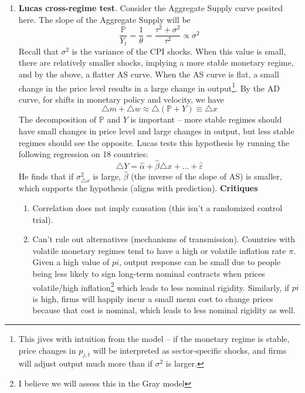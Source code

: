 \documentclass[12pt]{article}
\begin{document}
\begin{itemize}
\begin{enumerate}
        \item \textbf{Lucas cross-regime test}. Consider the Aggregate Supply curve posited here. The slope of the Aggregate Supply will be 
        \[\frac{\mathbb{P}}{Y_t} = \frac{1}{\theta} = \frac{\tau^2 + \sigma^2}{\tau^2} \propto \sigma^2\]
        Recall that $\sigma^2$ is the variance of the CPI shocks. When this value is small, there are relatively smaller shocks, implying a more stable monetary regime, and by the above, a flatter AS curve. When the AS curve is flat, a small change in the price level results in a large change in output\footnote{This jives with intuition from the model -- if the monetary regime is stable, price changes in $p_{j,t}$ will be interpreted as sector-specific shocks, and firms will adjust output much more than if $\sigma^2$ is larger.}. By the AD curve, for shifts in monetary policy and velocity, we have
        \[\triangle m + \triangle w \approx \triangle(\mathbb{P}+Y) \equiv \triangle x\]
        The decomposition of $\mathbb{P}$ and $Y$ is important -- more stable regimes should have small changes in price level and large changes in output, but less stable regimes should see the opposite. Lucas tests this hypothesis by running the following regression on 18 countries:
        \begin{equation}\label{Lucas Regression}
            \triangle Y = \hat{\alpha} + \hat{\beta} \triangle x + \hdots + \hat{\varepsilon}
        \end{equation}
        He finds that if $\sigma^2_{\triangle x}$ is large, $\hat{\beta}$ (the inverse of the slope of AS) is smaller, which supports the hypothesis (aligns with prediction). 
        \newline
        \newline \textbf{Critiques}
        \begin{enumerate}
            \item Correlation does not imply causation (this isn't a randomized control trial).
            \item Can't rule out alternatives (mechanisms of transmission). Countries with volatile monetary regimes tend to have a high or volatile inflation rate $\pi$. Given a high value of $pi$, output response can be small due to people being less likely to sign long-term nominal contracts when prices volatile/high inflation\footnote{I believe we will assess this in the Gray model} which leads to less nominal rigidity. Similarly, if $pi$ is high, firms will happily incur a small menu cost to change prices because that cost is nominal, which leads to less nominal rigidity as well. 

\end{enumerate}
\end{enumerate}
\end{itemize}
\end{document}
